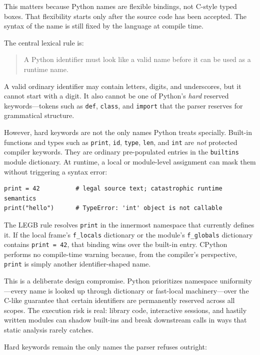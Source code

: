 \documentclass[a4paper,twoside]{report}
\begin{document}
This matters because Python names are flexible bindings, not C-style typed boxes. That flexibility starts only after the source code has been accepted. The syntax of the name is still fixed by the language at compile time.

The central lexical rule is:

\begin{quote}
A Python identifier must look like a valid name before it can be used as a runtime name.
\end{quote}

A valid ordinary identifier may contain letters, digits, and underscores, but it cannot start with a digit. It also cannot be one of Python's \emph{hard} reserved keywords---tokens such as \texttt{def}, \texttt{class}, and \texttt{import} that the parser reserves for grammatical structure.

However, hard keywords are not the only names Python treats specially. Built-in functions and types such as \texttt{print}, \texttt{id}, \texttt{type}, \texttt{len}, and \texttt{int} are \emph{not} protected compiler keywords. They are ordinary pre-populated entries in the \texttt{builtins} module dictionary. At runtime, a local or module-level assignment can mask them without triggering a syntax error:

\begin{verbatim}
print = 42          # legal source text; catastrophic runtime semantics
print("hello")      # TypeError: 'int' object is not callable
\end{verbatim}

The LEGB rule resolves \texttt{print} in the innermost namespace that currently defines it. If the local frame's \texttt{f\_locals} dictionary or the module's \texttt{f\_globals} dictionary contains \texttt{print = 42}, that binding wins over the built-in entry. CPython performs no compile-time warning because, from the compiler's perspective, \texttt{print} is simply another identifier-shaped name.

This is a deliberate design compromise. Python prioritizes namespace uniformity---every name is looked up through dictionary or fast-local machinery---over the C-like guarantee that certain identifiers are permanently reserved across all scopes. The execution risk is real: library code, interactive sessions, and hastily written modules can shadow built-ins and break downstream calls in ways that static analysis rarely catches.

Hard keywords remain the only names the parser refuses outright:
\end{document}
